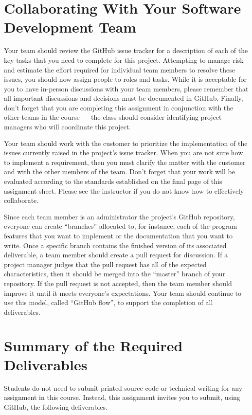 \documentclass[11pt]{article}
\begin{document}
\section*{Collaborating With Your Software Development Team}

Your team should review the GitHub issue tracker for a description of each of the key tasks that you need to complete
for this project. Attempting to manage risk and estimate the effort required for individual team members to resolve
these issues, you should now assign people to roles and tasks. While it is acceptable for you to have in-person
discussions with your team members, please remember that all important discussions and decisions must be documented in
GitHub. Finally, don't forget that you are completing this assignment in conjunction with the other teams in the course
--- the class should consider identifying project managers who will coordinate this project.

Your team should work with the customer to prioritize the implementation of the issues currently raised in the project's
issue tracker. When you are not sure how to implement a requirement, then you must clarify the matter with the customer
and with the other members of the team. Don't forget that your work will be evaluated according to the standards
established on the final page of this assignment sheet. Please see the instructor if you do not know how to
effectively collaborate.

Since each team member is an administrator the project's GitHub repository, everyone can create ``branches'' allocated
to, for instance, each of the program features that you want to implement or the documentation that you want to write.
Once a specific branch contains the finished version of its associated deliverable, a team member should create a pull
request for discussion. If a project manager judges that the pull request has all of the expected characteristics, then
it should be merged into the ``master'' branch of your repository. If the pull request is not accepted, then the team
member should improve it until it meets everyone's expectations. Your team should continue to use this model, called
``GitHub flow'', to support the completion of all deliverables.

\section*{Summary of the Required Deliverables}

\noindent Students do not need to submit printed source code or technical writing for any assignment in this course.
Instead, this assignment invites you to submit, using GitHub, the following deliverables.
\end{document}
